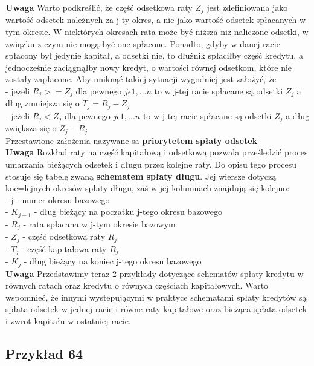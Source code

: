 \documentclass{article}
\begin{document}
\textbf{Uwaga} Warto podkreślić, że część odsetkowa raty $ Z_j $ jest zdefiniowana jako wartość odsetek należnych za j-ty okres, a nie jako wartość odsetek spłacanych w tym okresie. W niektórych okresach rata może być niższa niż naliczone odsetki, w związku z czym nie mogą być one spłacone. Ponadto, gdyby w danej racie spłacony był jedynie kapitał, a odsetki nie, to dłużnik spłaciłby część kredytu, a jednocześnie zaciągnąłby nowy kredyt, o wartości równej odsetkom, które nie zostały zapłacone. Aby uniknąć takiej sytuacji wygodniej jest założyć, że \\

- jezeli $ R_j >= Z_j $ dla pewnego $ j \epsilon {1,...n} $ to w j-tej racie spłacane są odsetki $ Z_j $ a dług zmniejsza się o $ T_j = R_j - Z_j $\\
- jeżeli $ R_j < Z_j $ dla pewnego $ j \epsilon {1,...n} $ to w j-tej racie spłacane są odsetki $ Z_j $ a dług zwiększa się o $ Z_j - R_j $\\

Przestawione założenia nazywane sa \textbf{priorytetem spłaty odsetek}\\

\textbf{Uwaga} Rozkład raty na część kapitałową i odsetkową pozwala prześledzić proces umarzania bieżących odsetek i długu przez kolejne raty. Do opisu tego procesu stosuje się tabelę zwaną \textbf{schematem spłaty długu}. Jej wiersze dotyczą koe=lejnych okresów spłaty długu, zaś w jej kolumnach znajdują się kolejno:\\

- j - numer okresu bazowego\\
- $ K_{j-1} $ - dług bieżący na poczatku j-tego okresu bazowego\\
- $ R_j $ - rata spłacana w j-tym okresie bazowym\\
- $ Z_j $ - część odsetkowa raty $ R_j $\\
- $ T_j $ - część kapitałowa raty $ R_j $\\
- $ K_j $ - dług bieżący na koniec j-tego okresu bazowego\\

\textbf{Uwaga} Przedstawimy teraz 2 przykłady dotyczące schematów spłaty kredytu w równych ratach oraz kredytu o równych częściach kapitałowych. Warto wspomnieć, że innymi wystepującymi w praktyce schematami spłaty kredytów są spłata odsetek w jednej racie i równe raty kapitałowe oraz bieżąca spłata odsetek i zwrot kapitału w ostatniej racie.

\subsection{Przykład 64}
\end{document}
